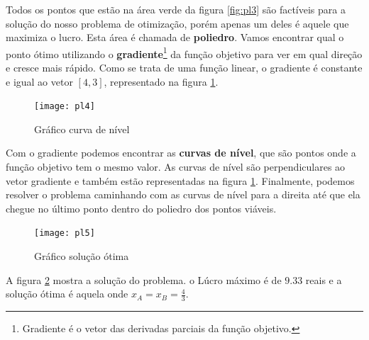 Todos os pontos que estão na área verde da figura \ref{fig:pl3} são factíveis para a solução do nosso problema de otimização, porém apenas um deles é aquele que maximiza o lucro. Esta área é chamada de \textbf{poliedro}. Vamos encontrar qual o ponto ótimo utilizando o \textbf{gradiente}\footnote{Gradiente é o vetor das derivadas parciais da função objetivo.} da função objetivo para ver em qual direção e cresce mais rápido. Como se trata de uma função linear, o gradiente é constante e igual ao vetor $[4,3]$, representado na figura \ref{fig:pl4}.

\begin{figure}[H]
\begin{centering}
\texttt{[image: pl4]}\protect\caption{\label{fig:pl4}Gráfico curva de nível}
\end{centering}
\end{figure}

Com o gradiente podemos encontrar as \textbf{curvas de nível}, que são pontos onde a função objetivo tem o mesmo valor. As curvas de nível são perpendiculares ao vetor gradiente e também estão representadas na figura \ref{fig:pl4}. Finalmente, podemos resolver o problema caminhando com as curvas de nível para a direita até que ela chegue no último ponto dentro do poliedro dos pontos viáveis. 

\begin{figure}[H]
\begin{centering}
\texttt{[image: pl5]}\protect\caption{\label{fig:pl5}Gráfico solução ótima}
\end{centering}
\end{figure}

A figura \ref{fig:pl5} mostra a solução do problema. o Lúcro máximo é de $9.33$ reais e a solução ótima é aquela onde $x_A=x_B=\frac{4}{3}$.


